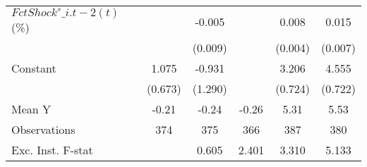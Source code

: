 {\begin{tabular}{l*{5}{c}}
\addlinespace
$ FctShock^s\_{i.t-2}(t)$ (\%)&                     &      -0.005         &                     &       0.008\sym{*}  &       0.015\sym{**} \\
                    &                     &     (0.009)         &                     &     (0.004)         &     (0.007)         \\
\addlinespace
Constant            &       1.075         &      -0.931         &                     &       3.206\sym{***}&       4.555\sym{***}\\
                    &     (0.673)         &     (1.290)         &                     &     (0.724)         &     (0.722)         \\
\midrule
Mean Y              &       -0.21         &       -0.24         &       -0.26         &        5.31         &        5.53         \\
Observations        &         374         &         375         &         366         &         387         &         380         \\
Exc. Inst. F-stat   &                     &       0.605         &       2.401         &       3.310         &       5.133         \\
\bottomrule
\end{tabular}
}
